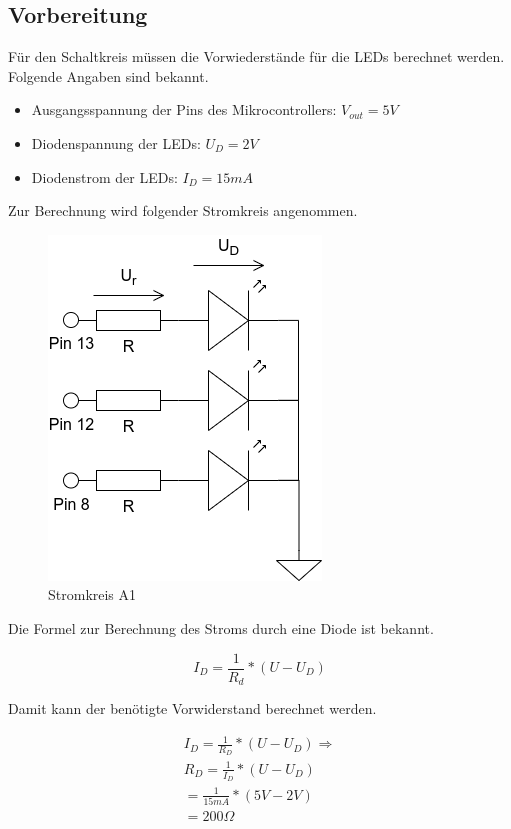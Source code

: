 \subsection{Vorbereitung}
\label{subsec:A1-vorbereitung}

Für den Schaltkreis müssen die Vorwiederstände für die LEDs berechnet werden.
Folgende Angaben sind bekannt.

\begin{itemize}
    \item Ausgangsspannung der Pins des Mikrocontrollers: $V_{out} = 5V$
    \item Diodenspannung der LEDs: $U_D = 2V$
    \item Diodenstrom der LEDs: $I_D = 15mA$
\end{itemize}

Zur Berechnung wird folgender Stromkreis angenommen.

\begin{figure}[h]
    \centering
    \includegraphics[height=0.4\textheight]{pictures/A1.png}
    \caption{Stromkreis A1}
    \label{fig:stromkreis-a1}
\end{figure}

Die Formel zur Berechnung des Stroms durch eine Diode ist bekannt.

\begin{equation}
    I_D =  \frac{1}{R_d} * (U - U_D) \label{eq:diodenstrom}
\end{equation}

Damit kann der benötigte Vorwiderstand berechnet werden.

\begin{equation}
    \begin{align}
        I_D =  \frac{1}{R_D} * (U - U_D) \Rightarrow \\
        R_D = \frac{1}{I_D} * (U - U_D) \\
        = \frac{1}{15mA} * (5V - 2V) \\
        = 200\Omega
    \end{align}
    \label{eq:equation-a1}
\end{equation}

